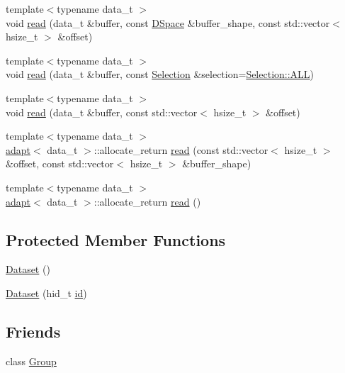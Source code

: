 \begin{DoxyCompactItemize}
\item 
{\footnotesize template$<$typename data\-\_\-t $>$ }\\void \hyperlink{class_h5_t_l_1_1_dataset_aa8d9fd06fae090ddded69ac66040443a}{read} (data\-\_\-t \&buffer, const \hyperlink{class_h5_t_l_1_1_d_space}{D\-Space} \&buffer\-\_\-shape, const std\-::vector$<$ hsize\-\_\-t $>$ \&offset)
\item 
{\footnotesize template$<$typename data\-\_\-t $>$ }\\void \hyperlink{class_h5_t_l_1_1_dataset_a1b66996cc6de6e7ea03a110e15888a3a}{read} (data\-\_\-t \&buffer, const \hyperlink{class_h5_t_l_1_1_selection}{Selection} \&selection=\hyperlink{class_h5_t_l_1_1_selection_a32d830ebff3c607e0425fa5d6ef72df0}{Selection\-::\-A\-L\-L})
\item 
{\footnotesize template$<$typename data\-\_\-t $>$ }\\void \hyperlink{class_h5_t_l_1_1_dataset_aa7ffa9c5a6f1e11351fecea1dbf7d9c5}{read} (data\-\_\-t \&buffer, const std\-::vector$<$ hsize\-\_\-t $>$ \&offset)
\item 
{\footnotesize template$<$typename data\-\_\-t $>$ }\\\hyperlink{struct_h5_t_l_1_1adapt}{adapt}$<$ data\-\_\-t $>$\-::allocate\-\_\-return \hyperlink{class_h5_t_l_1_1_dataset_a993f08f7a55ecf7cef453c58af2de7c8}{read} (const std\-::vector$<$ hsize\-\_\-t $>$ \&offset, const std\-::vector$<$ hsize\-\_\-t $>$ \&buffer\-\_\-shape)
\item 
{\footnotesize template$<$typename data\-\_\-t $>$ }\\\hyperlink{struct_h5_t_l_1_1adapt}{adapt}$<$ data\-\_\-t $>$\-::allocate\-\_\-return \hyperlink{class_h5_t_l_1_1_dataset_add8fa95fb77a9167f432e5d6abddc2ed}{read} ()
\end{DoxyCompactItemize}
\subsection*{Protected Member Functions}
\begin{DoxyCompactItemize}
\item 
\hyperlink{class_h5_t_l_1_1_dataset_af6f2cd1a5170e2b7d866721c9be0fd11}{Dataset} ()
\item 
\hyperlink{class_h5_t_l_1_1_dataset_a0857ba27c707399302da28064342915f}{Dataset} (hid\-\_\-t \hyperlink{class_h5_t_l_1_1_i_d_ade483b65e8a77310b025e86b11cbc38c}{id})
\end{DoxyCompactItemize}
\subsection*{Friends}
\begin{DoxyCompactItemize}
\item 
class \hyperlink{class_h5_t_l_1_1_dataset_a2697825715974a353728f0d4d5658112}{Group}
\end{DoxyCompactItemize}

